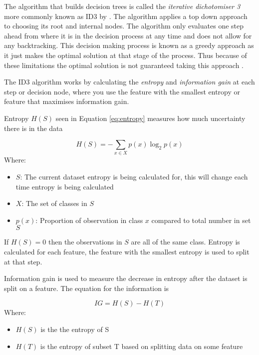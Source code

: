 The algorithm that builds decision trees is called the \textit{iterative dichotomiser 3} more commonly known as ID3 by \cite{quinlan_induction_1986}. The algorithm applies a top down approach to choosing its root and internal nodes. The algorithm only evaluates one step ahead from where it is in the decision process at any time and does not allow for any backtracking. This decision making process is known as a greedy approach as it just makes the optimal solution at that stage of the process. Thus because of these limitations the optimal solution is not guaranteed taking this approach \citep{friedman_lazy_1996}.

The ID3 algorithm works by calculating the \textit{entropy} and \textit{information gain} at each step or decision node, where you use the feature with the smallest entropy or feature that maximises information gain.

Entropy $H(S)$ seen in Equation \ref{eq:entropy} measures how much uncertainty there is in the data \citep{shannon_mathematical_2001}

\begin{equation} \label{eq:entropy}
	H(S) = - \sum_{x \in X} p(x) \log_{2} p(x)
\end{equation}
Where:
\begin{itemize}[label=]
	\item $S$: The current dataset entropy is being calculated for, this will change each time entropy is being calculated
	\item $X$: The set of classes in $S$
	\item $p(x)$: Proportion of observation in class $x$ compared to total number in set $S$
\end{itemize}
If $H(S) = 0$ then the observations in $S$ are all of the same class. Entropy is calculated for each feature, the feature with the smallest entropy is used to split at that step.

Information gain is used to measure the decrease in entropy after the dataset is split on a feature. The equation for the information is 

\begin{equation} \label{eq:infoGain}
	IG = H(S) -  H(T)
\end{equation}
Where:
\begin{itemize}[label=]
	\item $H(S)$ is the the entropy of S
	\item $H(T)$ is the entropy of subset T based on splitting data on some feature
\end{itemize}

